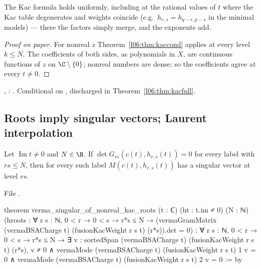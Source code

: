 \begin{physics}
The Kac formula holds uniformly, including at the rational values of $t$ where the Kac table
degenerates and weights coincide (e.g.\ $h_{r,s} = h_{q-r,p-s}$ in the minimal models) --- there the factors
simply merge, and the exponents add.
\end{physics}

\begin{proof}[Proof on paper]
For nonreal $z$ Theorem~\ref{l06:thm:kaccond} applies at every level $k\le N$. The coefficients of both
sides, as polynomials in $X$, are continuous functions of $z$ on $\C\setminus\{0\}$; nonreal numbers are
dense; so the coefficients agree at every $t\ne0$.
\end{proof}

\begin{status}
\allowbreak{}\allowbreak{}, \allowbreak{}\allowbreak{}\allowbreak{}\allowbreak{}\allowbreak{}:
\lean{[propext, Classical.}\allowbreak{}\allowbreak\lean{sound]}. Conditional on , discharged in
Theorem~\ref{l06:thm:kacfull}.
\end{status}

\subsection{Roots imply singular vectors; Laurent interpolation}

\begin{theorem}\label{l06:thm:bootstrap}
Let $\operatorname{Im}t\ne0$ and $N\in\N$. If $\det G_{rs}(c(t),h_{r,s}(t)) = 0$ for every label with $rs\le N$,
then for every such label $M(c(t),h_{r,s}(t))$ has a singular vector at level $rs$.
\end{theorem}

File .
\begin{leancode}
theorem verma_singular_of_nonreal_kac_roots (t : ℂ) (ht : t.im ≠ 0) (N : ℕ)
    (hroots : ∀ r s : ℕ, 0 < r → 0 < s → r*s ≤ N →
      (vermaGramMatrix (vermaBSACharge t) (fusionKacWeight r s t) (r*s)).det = 0) :
    ∀ r s : ℕ, 0 < r → 0 < s → r*s ≤ N →
      ∃ v : sortedSpan (vermaBSACharge t) (fusionKacWeight r s t) (r*s),
        v ≠ 0 ∧ vermaMode (vermaBSACharge t) (fusionKacWeight r s t) 1 v = 0 ∧
          vermaMode (vermaBSACharge t) (fusionKacWeight r s t) 2 v = 0 := by
\end{leancode}

